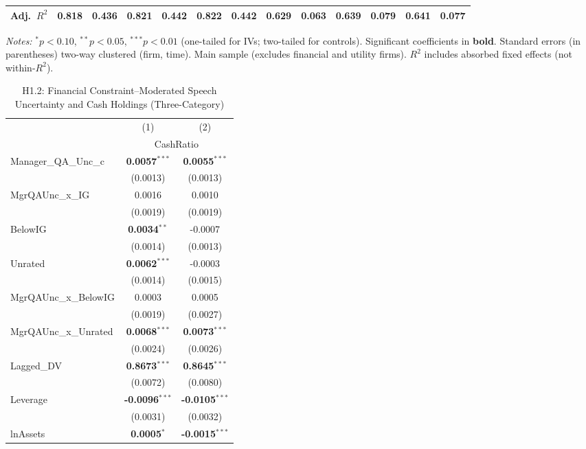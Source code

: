 \documentclass[11pt,a4paper]{article}
\begin{document}
\begin{table}[htbp]
\begin{tabular}{lcccccccccccc}
Adj.~$R^2$ & 0.818 & 0.436 & 0.821 & 0.442 & 0.822 & 0.442 & 0.629 & 0.063 & 0.639 & 0.079 & 0.641 & 0.077 \\
\bottomrule
\end{tabular}
\begin{minipage}{\linewidth}
\vspace{2pt}\scriptsize
\textit{Notes:} $^{*}p<0.10$, $^{**}p<0.05$, $^{***}p<0.01$ (one-tailed for IVs; two-tailed for controls).
 Significant coefficients in \textbf{bold}.
 Standard errors (in parentheses) two-way clustered (firm, time).
 Main sample (excludes financial and utility firms).
 $R^2$ includes absorbed fixed effects (not within-$R^2$).
\end{minipage}
\end{table}
\clearpage
\begin{table}[htbp]
\centering
\caption{H1.2: Financial Constraint--Moderated Speech Uncertainty and Cash Holdings (Three-Category)}
\label{tab:h1_2}
\scriptsize
\begin{tabular}{lcc}
\toprule
 & (1) & (2) \\
 & \multicolumn{2}{c}{CashRatio} \\
\cmidrule(lr){2-3}
\midrule
Manager\_QA\_Unc\_c & \textbf{0.0057}$^{***}$ & \textbf{0.0055}$^{***}$ \\
 & (0.0013) & (0.0013) \\
MgrQAUnc\_x\_IG & 0.0016 & 0.0010 \\
 & (0.0019) & (0.0019) \\
BelowIG & \textbf{0.0034}$^{**}$ & -0.0007 \\
 & (0.0014) & (0.0013) \\
Unrated & \textbf{0.0062}$^{***}$ & -0.0003 \\
 & (0.0014) & (0.0015) \\
MgrQAUnc\_x\_BelowIG & 0.0003 & 0.0005 \\
 & (0.0019) & (0.0027) \\
MgrQAUnc\_x\_Unrated & \textbf{0.0068}$^{***}$ & \textbf{0.0073}$^{***}$ \\
 & (0.0024) & (0.0026) \\
Lagged\_DV & \textbf{0.8673}$^{***}$ & \textbf{0.8645}$^{***}$ \\
 & (0.0072) & (0.0080) \\
\midrule
Leverage & \textbf{-0.0096}$^{***}$ & \textbf{-0.0105}$^{***}$ \\
 & (0.0031) & (0.0032) \\
lnAssets & \textbf{0.0005}$^{*}$ & \textbf{-0.0015}$^{***}$ \\

\end{tabular}
\end{table}
\end{document}
